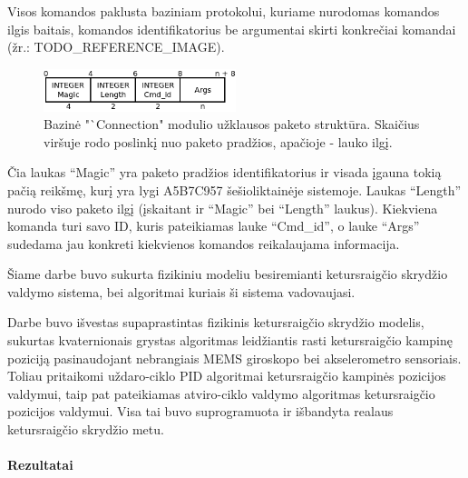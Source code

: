 \documentclass[12pt, a4paper, lithuanian, final]{article}
\begin{document}
Visos komandos paklusta baziniam protokolui, kuriame nurodomas komandos ilgis baitais, komandos identifikatorius be argumentai skirti konkrečiai komandai (žr.: TODO\_REFERENCE\_IMAGE).

\begin{figure}[H]
\begin{center}
\includegraphics[width=0.5\textwidth]{img/basePacket.png}
\caption{Bazinė "`Connection" modulio užklausos paketo struktūra. Skaičius viršuje rodo poslinkį nuo paketo pradžios, apačioje - lauko ilgį.}
\end{center}
\end{figure}

Čia laukas "`Magic"' yra paketo pradžios identifikatorius ir visada įgauna tokią pačią reikšmę, kurį yra lygi A5B7C957 šešioliktainėje sistemoje.
Laukas "`Length"' nurodo viso paketo ilgį (įskaitant ir "`Magic"' bei "`Length"' laukus). Kiekviena komanda turi savo ID, kuris pateikiamas lauke "`Cmd\_id"', o lauke "`Args"' sudedama jau konkreti kiekvienos komandos reikalaujama informacija.







Šiame darbe buvo sukurta fizikiniu modeliu besiremianti ketursraigčio skrydžio valdymo sistema, bei algoritmai kuriais ši sistema vadovaujasi.


Darbe buvo išvestas supaprastintas fizikinis ketursraigčio skrydžio modelis, sukurtas kvaternionais grystas algoritmas leidžiantis rasti ketursraigčio kampinę poziciją pasinaudojant nebrangiais MEMS giroskopo bei akselerometro sensoriais.
Toliau pritaikomi uždaro-ciklo PID algoritmai ketursraigčio kampinės pozicijos valdymui, taip pat pateikiamas atviro-ciklo valdymo algoritmas ketursraigčio pozicijos valdymui.
Visa tai buvo suprogramuota ir išbandyta realaus ketursraigčio skrydžio metu.


\paragraph{Rezultatai}
\end{document}
